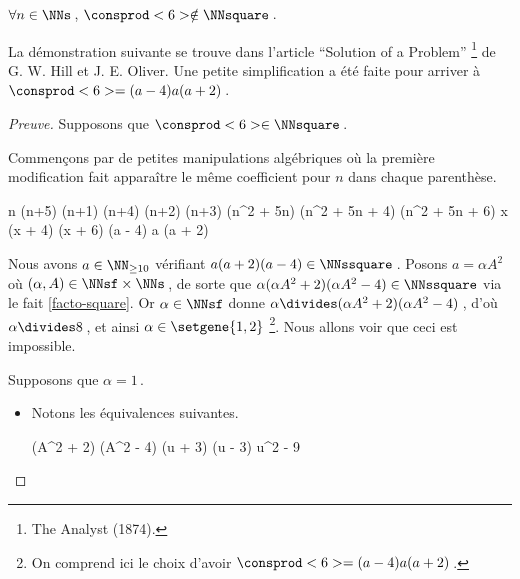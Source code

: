 \begin{fact} \label{case-6}
	 $\forall n \in \NNs$\,, $\consprod<6> \notin \NNsquare$\,.
\end{fact}




La démonstration suivante se trouve dans l'article \enquote{Solution of a Problem}
\footnote{
	The Analyst (1874).
}
de G. W. Hill et J. E. Oliver.
Une petite simplification a été faite pour arriver à $\consprod<6> = (a - 4) a (a + 2)$\,.


\begin{proof}[Preuve]%
    Supposons que $\consprod<6> \in \NNsquare$\,.
    
    \smallskip
    
    Commençons par de petites manipulations algébriques où la première modification fait apparaître le même coefficient pour $n$ dans chaque parenthèse.
    
    \medskip
    \begin{stepcalc}[style = sar]
	\explnext{}
		n (n+5) \cdot (n+1) (n+4) \cdot (n+2) (n+3)
	\explnext{}
		(n^2 + 5n) (n^2 + 5n + 4) (n^2 + 5n + 6)
		x (x + 4) (x + 6)
		(a - 4) a (a + 2)
    \end{stepcalc}
  
    \medskip
    Nous avons $a \in \NN_{\geq 10}$ vérifiant $a (a + 2) (a - 4) \in \NNssquare$\,. 
    Posons $a = \alpha A^2$ où $(\alpha, A) \in \NNsf \times \NNs$\,,
    de sorte que $\alpha (\alpha A^2 + 2) (\alpha A^2 - 4) \in \NNssquare$ via le fait \ref{facto-square}.
    Or $\alpha\in \NNsf$ donne $\alpha \divides (\alpha A^2 + 2) (\alpha A^2 - 4)$\,, 
    d'où $\alpha \divides 8$\,, et ainsi $\alpha \in \setgene{1, 2}$
    \footnote{
    	On comprend ici le choix d'avoir $\consprod<6> = (a - 4) a (a + 2)$\,.
    }.
    Nous allons voir que ceci est impossible.
    
    \medskip
    
    Supposons que $\alpha = 1$\,.
    \begin{itemize}
    	\item Notons les équivalences suivantes.
        
        \noindent\kern-6pt%
        \begin{stepcalc}[style=ar*, ope=\iff]
        	(A^2 + 2) (A^2 - 4) \in \NNssquare
        	(u + 3) (u - 3) \in \NNssquare
    	\explnext{}
        	u^2 - 9 \in \NNssquare
        \end{stepcalc}


\end{itemize}
\end{proof}
